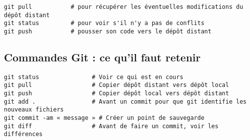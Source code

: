 \documentclass[11pt]{article}
\begin{document}
\noindent
\verb"git pull           # pour récupérer les éventuelles modifications du dépôt distant" \\
\verb"git status         # pour voir s'il n'y a pas de conflits" \\
\verb"git push           # pousser son code vers le dépôt distant" \\



\subsection*{Commandes Git : ce qu'il faut retenir}

\noindent
\verb"git status               # Voir ce qui est en cours" \\
\verb"git pull                 # Copier dépôt distant vers dépôt local" \\
\verb"git push                 # Copier dépôt local vers dépôt distant" \\
\verb"git add .                # Avant un commit pour que git identifie les nouveaux fichiers" \\
\verb"git commit -am « message » # Créer un point de sauvegarde" \\
\verb"git diff                 # Avant de faire un commit, voir les différences" \\
\end{document}

